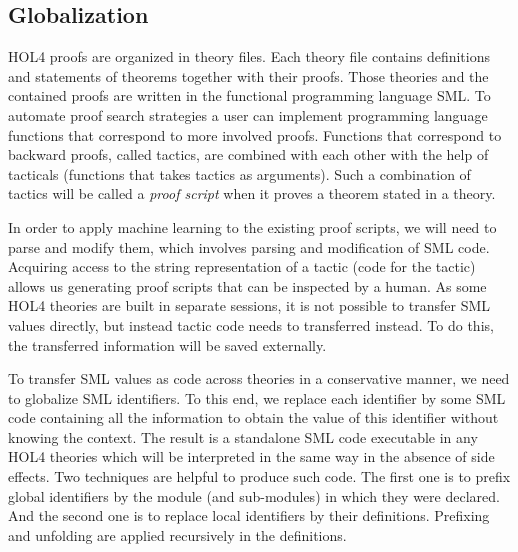 \documentclass[runningheads,a4paper,draft]{svjour3}
\def\holfour{\textsf{HOL4}\xspace}
\def\sml{\textsf{SML}\xspace}
\begin{document}
\subsection{Globalization}

\holfour proofs are organized in theory files.
Each theory file contains definitions and statements of theorems together with
their proofs. Those theories and the contained proofs
are written
in the functional programming language \sml. To automate
proof search strategies a user can implement programming language functions
that correspond to more involved proofs.
Functions that correspond to backward proofs, called tactics, are combined with 
each other with the help of 
tacticals (functions that takes
tactics as arguments). Such a combination of tactics will be called a 
\emph{proof script} when it
proves a theorem stated in a theory.

In order to apply machine learning to the existing proof scripts, we will need 
to
parse and modify them, which involves parsing and modification of \sml code.
Acquiring access to the string representation of a tactic (code for the tactic) 
allows us generating
proof scripts that can be inspected by a human.
As some \holfour theories are built in separate sessions, it is not possible
to transfer \sml values directly, but instead tactic code needs to transferred 
instead.
To do this, the transferred information will be saved externally.


To transfer \sml values as code across theories in a conservative manner, we 
need to 
globalize \sml identifiers. To this end, we replace each identifier by some 
\sml code containing all the information to obtain the value of this identifier 
without knowing the context. The result is a standalone \sml code executable in 
any \holfour theories which will be interpreted in the same way in the absence 
of side effects. Two techniques are helpful to produce such code. The first one 
is to prefix global identifiers by the module (and sub-modules) in which they 
were declared. And the second one is to replace local identifiers 
by their definitions. Prefixing and 
unfolding are applied recursively in 
the definitions.
\end{document}
